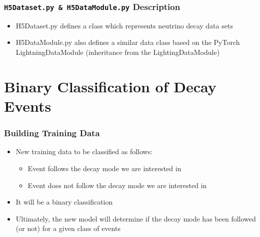 \documentclass{beamer}
\begin{document}


\begin{frame}
	\frametitle{\texttt{H5Dataset.py \& H5DataModule.py} Description}
	
	\begin{itemize}
		\item H5Dataset.py defines a class which represents neutrino decay data sets
		\item H5DataModule.py also defines a similar data class based on the PyTorch LightningDataModule (inheritance from the LightingDataModule)
	\end{itemize}
\end{frame}


\section{Binary Classification of Decay Events}

\begin{frame}
\frametitle{Building Training Data}
	\begin{itemize}
		\item New training data to be classified as follows:
			\begin{itemize}
				\item Event follows the decay mode we are interested in
				\item Event does not follow the decay mode we are interested in
			\end{itemize}
		\item It will be a binary classification
		\item Ultimately, the new model will determine if the decay mode has been followed (or not) for a given class of events
	\end{itemize}
\end{frame}
\end{document}
